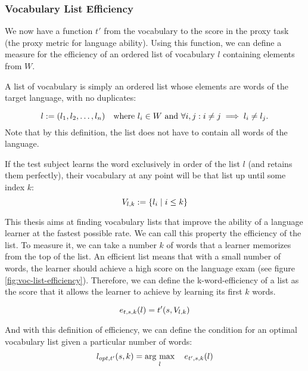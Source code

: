 \subsubsection{Vocabulary List Efficiency}
We now have a function $t'$ from the vocabulary to the score in the proxy task (the proxy metric for language ability).
Using this function, we can define a measure for the efficiency of an ordered list of vocabulary $l$ containing elements from $W$.

A list of vocabulary is simply an ordered list whose elements are words of the target language, with no duplicates:

\begin{equation*}
	l        := (l_1, l_2, \dots, l_n) \quad \text{where } l_i \in W \text{ and } \forall i,j: i \neq j \implies l_i \neq l_j . \\
\end{equation*}
Note that by this definition, the list does not have to contain all words of the language.

If the test subject learns the word exclusively in order of the list $l$ (and retains them perfectly), their vocabulary at any point will be that list up until some index $k$:
\begin{equation*}
	V_{l, k} := \{l_i \mid i \leq k\}                                                                                 \\
\end{equation*}


This thesis aims at finding vocabulary lists that improve the ability of a language learner at the fastest possible rate.
We can call this property the efficiency of the list.
To measure it, we can take a number $k$ of words that a learner memorizes from the top of the list.
An efficient list means that with a small number of words, the learner should achieve a high score on the language exam (see figure \ref{fig:voc-list-efficiency}).
Therefore, we can define the k-word-efficiency of a list as the score that it allows the learner to achieve by learning its first $k$ words.

\begin{equation}
	e_{t, s, k}(l) =  t'(s,  V_{l, k})\\
\end{equation}

And with this definition of efficiency, we can define the condition for an optimal vocabulary list given a particular number of words:
\begin{equation} \label{eq:optimal-vocab-list}
	l_{opt, t'} (s, k) = \mathop{\rm arg~max}\limits_{l} \quad e_{t', s, k}(l)
\end{equation}

